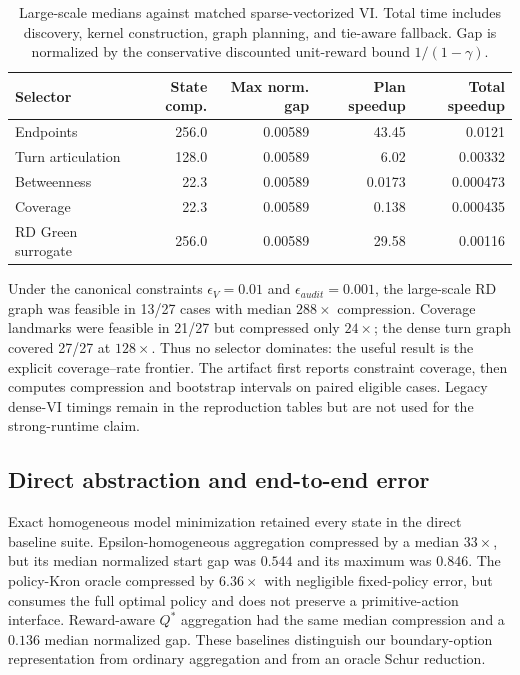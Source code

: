 \documentclass[10pt]{article}
\begin{document}
\begin{table}[H]
\centering
\caption{Large-scale medians against matched sparse-vectorized VI. Total time
includes discovery, kernel construction, graph planning, and tie-aware
fallback. Gap is normalized by the conservative discounted unit-reward bound
$1/(1-\gamma)$.}
\label{tab:strong-runtime}
\footnotesize
\begin{tabular}{lrrrr}
\toprule
Selector & State comp. & Max norm. gap & Plan speedup & Total speedup\\
\midrule
Endpoints & 256.0 & 0.00589 & 43.45 & 0.0121\\
Turn articulation & 128.0 & 0.00589 & 6.02 & 0.00332\\
Betweenness & 22.3 & 0.00589 & 0.0173 & 0.000473\\
Coverage & 22.3 & 0.00589 & 0.138 & 0.000435\\
RD Green surrogate & 256.0 & 0.00589 & 29.58 & 0.00116\\
\bottomrule
\end{tabular}
\end{table}

Under the canonical constraints $\epsilon_V=0.01$ and
$\epsilon_{audit}=0.001$, the large-scale RD graph was feasible in 13/27 cases
with median $288\times$ compression. Coverage landmarks were feasible in 21/27
but compressed only $24\times$; the dense turn graph covered 27/27 at
$128\times$. Thus no selector dominates: the useful result is the explicit
coverage--rate frontier. The artifact first reports constraint coverage, then
computes compression and bootstrap intervals on paired eligible cases. Legacy
dense-VI timings remain in the reproduction tables but are not used for the
strong-runtime claim.

\subsection{Direct abstraction and end-to-end error}
Exact homogeneous model minimization retained every state in the direct
baseline suite. Epsilon-homogeneous aggregation compressed by a median
$33\times$, but its median normalized start gap was $0.544$ and its maximum was
$0.846$. The policy-Kron oracle compressed by $6.36\times$ with negligible
fixed-policy error, but consumes the full optimal policy and does not preserve a
primitive-action interface. Reward-aware $Q^*$ aggregation had the same median
compression and a $0.136$ median normalized gap. These baselines distinguish
our boundary-option representation from ordinary aggregation and from an
oracle Schur reduction.
\end{document}
